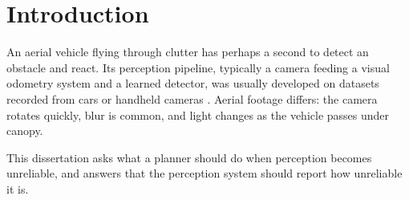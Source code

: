 \chapter{Introduction}
\label{ch:introduction}

An aerial vehicle flying through clutter has perhaps a second to detect an obstacle and react.
Its perception pipeline, typically a camera feeding a visual odometry system and a learned
detector, was usually developed on datasets recorded from cars or handheld cameras
\citep{geiger2012}. Aerial footage differs: the camera rotates quickly, blur is common, and
light changes as the vehicle passes under canopy.

This dissertation asks what a planner should do when perception becomes unreliable, and
answers that the perception system should report how unreliable it is.
